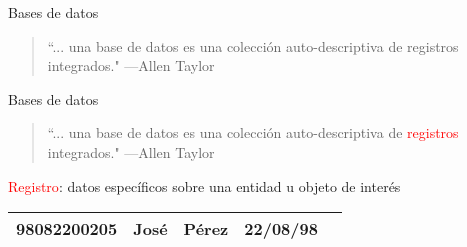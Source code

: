 \begin{frame}{Bases de datos}
    \begin{overlayarea}{\linewidth}{\textheight}
        \begin{onlyenv}
            \begin{block}{}
                \begin{quote}
                    ``... una base de datos es una colecci\'on auto-descriptiva de registros integrados."
                    \hspace{1em plus 1fill}---Allen Taylor
                \end{quote}
            \end{block}
      \end{onlyenv}
    \end{overlayarea}
   

    
\end{frame}

\begin{frame}{Bases de datos}

    \begin{overlayarea}{\linewidth}{\textheight}
        \begin{onlyenv}
            \begin{block}{}
                \begin{quote}
                    ``... una base de datos es una colecci\'on auto-descriptiva de \textcolor{red}{registros} integrados."
                    \hspace{1em plus 1fill}---Allen Taylor
                \end{quote}
                
                \textcolor{red}{Registro}: datos espec\'ificos sobre una entidad u objeto de inter\'es
            \end{block}
      \end{onlyenv}
      \vspace{8mm}
      \centering
      \begin{tabular}{|c|c|c|c|c|}
          \hline
          98082200205 & Jos\'e & P\'erez & 22/08/98\\
          \hline
      \end{tabular}
    \end{overlayarea}
   


    
\end{frame}

